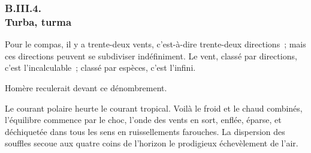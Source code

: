 \documentclass[french,twoside]{book} %
\begin{document}
 \subsubsection[{B.III.4. Turba, turma}]{B.III.4. \\
Turba, turma}
\noindent Pour le compas, il y a trente-deux vents, c’est-à-dire trente-deux directions ; mais ces directions peuvent se subdiviser indéfiniment. Le vent, classé par directions, c’est l’incalculable ; classé par espèces, c’est l’infini.\par
Homère reculerait devant ce dénombrement.\par
Le courant polaire heurte le courant tropical. Voilà le froid et le chaud combinés, l’équilibre commence par le choc, l’onde des vents en sort, enflée, éparse, et déchiquetée dans tous les sens en ruissellements farouches. La dispersion des souffles secoue aux quatre coins de l’horizon le prodigieux échevèlement de l’air.\par
\end{document}

